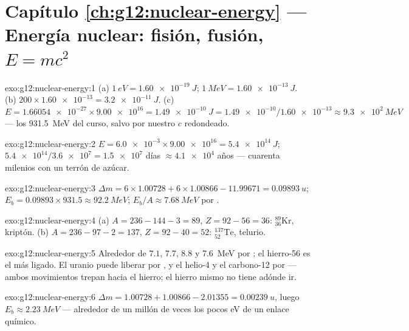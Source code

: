 \section*{Capítulo \ref{ch:g12:nuclear-energy} --- Energía nuclear: fisión, fusión, $E=mc^2$}

\begin{solution}{exo:g12:nuclear-energy:1}
(a) $\qty{1}{eV} = \qty{1.60e-19}{J}$;
$\qty{1}{MeV} = \qty{1.60e-13}{J}$.
(b) $200 \times \num{1.60e-13} = \qty{3.2e-11}{J}$.
(c) $E = \num{1.66054e-27} \times \num{9.00e16} = \qty{1.49e-10}{J}
= \num{1.49e-10}/\num{1.60e-13} \approx \qty{9.3e2}{MeV}$ --- los
\qty{931.5}{MeV} del curso, salvo por nuestro $c$ redondeado.
\end{solution}

\begin{solution}{exo:g12:nuclear-energy:2}
$E = \num{6.0e-3} \times \num{9.00e16} = \qty{5.4e14}{J}$;
$\num{5.4e14}/\num{3.6e7} = \num{1.5e7}$ días $\approx \num{4.1e4}$
años --- cuarenta milenios con un terrón de azúcar.
\end{solution}

\begin{solution}{exo:g12:nuclear-energy:3}
$\Delta m = 6 \times 1.00728 + 6 \times 1.00866 - 11.99671 =
\qty{0.09893}{u}$;
$E_b = 0.09893 \times 931.5 \approx \qty{92.2}{MeV}$;
$E_b/A \approx \qty{7.68}{MeV}$ por .
\end{solution}

\begin{solution}{exo:g12:nuclear-energy:4}
(a) $A = 236 - 144 - 3 = 89$, $Z = 92 - 56 = 36$:
${}^{89}_{36}\mathrm{Kr}$, kriptón.
(b) $A = 236 - 97 - 2 = 137$, $Z = 92 - 40 = 52$:
${}^{137}_{52}\mathrm{Te}$, telurio.
\end{solution}

\begin{solution}{exo:g12:nuclear-energy:5}
Alrededor de $7.1$, $7.7$, $8.8$ y \qty{7.6}{MeV} por ; el
hierro-56 es el más ligado. El uranio puede liberar  por ,
y el helio-4 y el carbono-12 por  --- ambos movimientos trepan
hacia el hierro; el hierro mismo no tiene adónde ir.
\end{solution}

\begin{solution}{exo:g12:nuclear-energy:6}
$\Delta m = 1.00728 + 1.00866 - 2.01355 = \qty{0.00239}{u}$, luego
$E_b \approx \qty{2.23}{MeV}$ --- alrededor de un millón de veces los
pocos \unit{eV} de un enlace químico.
\end{solution}

